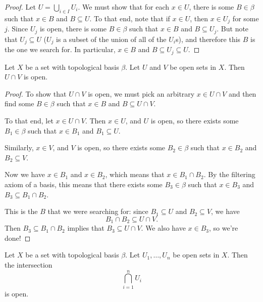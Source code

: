 \documentclass[noname]{notes}
\begin{document}
\begin{proof}
	Let $U = \bigcup_{i \in I} U_i$. We must show that for each $x \in U$, there is some $B \in \beta$ such that $x \in B$ and $B \subseteq U$. To that end, note that if $x \in U$, then $x \in U_j$ for some $j$. Since $U_j$ is open, there is some $B \in \beta$ such that $x \in B$ and $B \subseteq U_j$. But note that $U_j \subseteq U$ ($U_j$ is a subset of the union of all of the $U_i$s), and therefore this $B$ is the one we search for. In particular, $x \in B$ and $B \subseteq U_j \subseteq U$. 
\end{proof}

\begin{lemma}
	\label{intersection of two opens is open}
	Let $X$ be a set with topological basis $\beta$. Let $U$ and $V$ be open sets in $X$. Then $U \cap V$ is open. 
\end{lemma}

\begin{proof}
	To show that $U \cap V$ is open, we must pick an arbitrary $x \in U \cap V$ and then find some $B \in \beta$ such that $x \in B$ and $B \subseteq U \cap V$. 
	
	To that end, let $x \in U \cap V$. Then $x \in U$, and $U$ is open, so there exists some $B_1 \in \beta$ such that $x \in B_1$ and $B_1 \subseteq U$. 
	
	Similarly, $x \in V$, and $V$ is open, so there exists some $B_2 \in \beta$ such that $x \in B_2$ and $B_2 \subseteq V$. 
	
	Now we have $x \in B_1$ and $x \in B_2$, which means that $x \in B_1 \cap B_2$. By the filtering axiom of a basis, this means that there exists some $B_3 \in \beta$ such that $x \in B_3$ and $B_3 \subseteq B_1 \cap B_2$. 
	
	This is the $B$ that we were searching for: since $B_1 \subseteq U$ and $B_2 \subseteq V$, we have 
	\[
		B_1 \cap B_2 \subseteq U \cap V. 
	\]
	Then $B_3 \subseteq B_1 \cap B_2$ implies that $B_3 \subseteq U \cap V$. We also have $x \in B_3$, so we're done! 
\end{proof}

\begin{lemma}
	\label{finite intersections of basis opens}
	Let $X$ be a set with topological basis $\beta$. Let $U_1, \ldots, U_n$ be open sets in $X$. Then the intersection 
	\[
		\bigcap_{i=1}^n U_i
	\]
	is open. 
\end{lemma}
\end{document}
